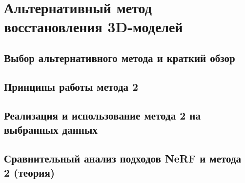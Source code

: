 \chapter{Альтернативный метод восстановления 3D-моделей}

\section{Выбор альтернативного метода и краткий обзор}
\section{Принципы работы метода 2}
\section{Реализация и использование метода 2 на выбранных данных}
\section{Сравнительный анализ подходов NeRF и метода 2 (теория)}

